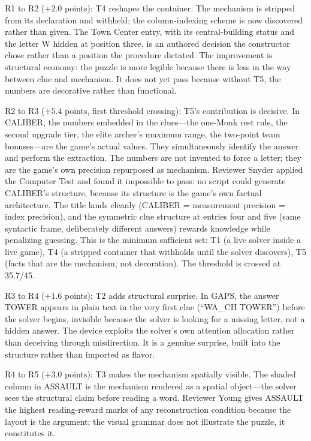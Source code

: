 R1 to R2 ($+2.0$ points): T4 reshapes the container. The mechanism is stripped from its declaration and withheld; the column-indexing scheme is now discovered rather than given. The Town Center entry, with its central-building status and the letter W hidden at position three, is an authored decision the constructor chose rather than a position the procedure dictated. The improvement is structural economy: the puzzle is more legible because there is less in the way between clue and mechanism. It does not yet pass because without T5, the numbers are decorative rather than functional.

R2 to R3 ($+5.4$ points, first threshold crossing): T5's contribution is decisive. In CALIBER, the numbers embedded in the clues---the one-Monk rest rule, the second upgrade tier, the elite archer's maximum range, the two-point team bonuses---are the game's actual values. They simultaneously identify the answer and perform the extraction. The numbers are not invented to force a letter; they are the game's own precision repurposed as mechanism. Reviewer Snyder applied the Computer Test and found it impossible to pass: no script could generate CALIBER's structure, because its structure is the game's own factual architecture. The title lands cleanly (CALIBER = measurement precision = index precision), and the symmetric clue structure at entries four and five (same syntactic frame, deliberately different answers) rewards knowledge while penalizing guessing. This is the minimum sufficient set: T1 (a live solver inside a live game), T4 (a stripped container that withholds until the solver discovers), T5 (facts that are the mechanism, not decoration). The threshold is crossed at 35.7/45.

R3 to R4 ($+1.6$ points): T2 adds structural surprise. In GAPS, the answer TOWER appears in plain text in the very first clue (``WA\_CH TOWER'') before the solver begins, invisible because the solver is looking for a missing letter, not a hidden answer. The device exploits the solver's own attention allocation rather than deceiving through misdirection. It is a genuine surprise, built into the structure rather than imported as flavor.

R4 to R5 ($+3.0$ points): T3 makes the mechanism spatially visible. The shaded column in ASSAULT is the mechanism rendered as a spatial object---the solver sees the structural claim before reading a word. Reviewer Young gives ASSAULT the highest reading-reward marks of any reconstruction condition because the layout is the argument; the visual grammar does not illustrate the puzzle, it constitutes it.

